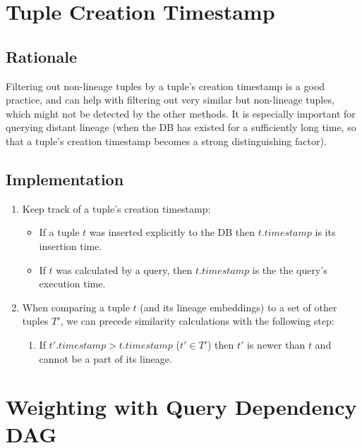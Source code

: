 \section{Tuple Creation Timestamp}
\subsection{Rationale} Filtering out non-lineage tuples by a tuple's creation timestamp is a good practice, and can help with filtering out very similar but non-lineage tuples, which might not be detected by the other methods. It is especially important for querying distant lineage (when the DB has existed for a sufficiently long time, so that a tuple's creation timestamp becomes a strong distinguishing factor).\\

\subsection{Implementation} 
\begin{enumerate}
    \item Keep track of a tuple's creation timestamp:
    \begin{itemize}
        \item If a tuple $t$ was inserted explicitly to the DB then $t.timestamp$ is its insertion time.
        \item If $t$ was calculated by a query, then $t.timestamp$ is the the query's execution time.
    \end{itemize}
    \item When comparing a tuple $t$ (and its lineage embeddings) to a set of other tuples $T'$, we can precede similarity calculations with the following step:
    \begin{enumerate}
        \item If $t'.timestamp > t.timestamp$ ($t' \in T'$) then $t'$ is newer than $t$ and cannot be a part of its lineage.
    \end{enumerate}
\end{enumerate}


\section{Weighting with Query Dependency DAG}
